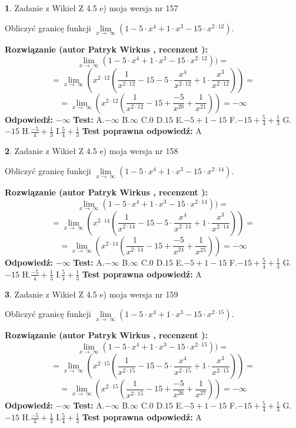 \documentclass[12pt, a4paper]{article}
\theoremstyle{definition} %
\newtheorem{zad}{}
\newcommand{\zadStart}[1]{\begin{zad}#1\newline}
\newcommand{\zadStop}{\end{zad}}
\newcommand{\rozwStart}[2]{\noindent \textbf{Rozwiązanie (autor #1 , recenzent #2): }\newline}
\newcommand{\rozwStop}{\newline}
\newcommand{\odpStart}{\noindent \textbf{Odpowiedź:}\newline}
\newcommand{\odpStop}{\newline}
\newcommand{\testStart}{\noindent \textbf{Test:}\newline}
\newcommand{\testStop}{\newline}
\newcommand{\kluczStart}{\noindent \textbf{Test poprawna odpowiedź:}\newline}
\newcommand{\kluczStop}{\newline}
\begin{document}
\zadStart{Zadanie z Wikieł Z 4.5 e) moja wersja nr 157}



Obliczyć granicę funkcji  $\lim\limits_{x\to\ \infty}(1 - 5 \cdot x^{4}+1 \cdot x^{3}- 15 \cdot x^{2\cdot12})$.
\zadStop
\rozwStart{Patryk Wirkus}{}
$$\lim\limits_{x\to\ \infty}(1 - 5 \cdot x^{4}+1 \cdot x^{3}- 15 \cdot x^{2\cdot12}))=$$
$$=\lim\limits_{x\to\ \infty}(x^{2\cdot12}(\frac{1}{x^{2\cdot12}}-15 -5 \cdot \frac{x^{4}}{x^{2\cdot12}}+1 \cdot \frac{x^{3}}{x^{2\cdot12}}))=$$
$$=\lim\limits_{x\to\ \infty}(x^{2\cdot12}(\frac{1}{x^{2\cdot12}}-15 + \frac{-5}{x^{20}}+ \frac{1}{x^{21}}))=-\infty$$
\rozwStop
\odpStart
$-\infty$
\odpStop
\testStart
A.$-\infty$ B.$\infty$ C.$0$ D.$15$ E.$-5 + 1 - 15$
F.$-15+\frac{5}{4}+\frac{1}{3}$ G.$-15$
H.$\frac{-5}{4}+\frac{1}{3}$
I.$\frac{5}{4}+\frac{1}{3}$
\testStop
\kluczStart
A
\kluczStop



\zadStart{Zadanie z Wikieł Z 4.5 e) moja wersja nr 158}



Obliczyć granicę funkcji  $\lim\limits_{x\to\ \infty}(1 - 5 \cdot x^{4}+1 \cdot x^{3}- 15 \cdot x^{2\cdot14})$.
\zadStop
\rozwStart{Patryk Wirkus}{}
$$\lim\limits_{x\to\ \infty}(1 - 5 \cdot x^{4}+1 \cdot x^{3}- 15 \cdot x^{2\cdot14}))=$$
$$=\lim\limits_{x\to\ \infty}(x^{2\cdot14}(\frac{1}{x^{2\cdot14}}-15 -5 \cdot \frac{x^{4}}{x^{2\cdot14}}+1 \cdot \frac{x^{3}}{x^{2\cdot14}}))=$$
$$=\lim\limits_{x\to\ \infty}(x^{2\cdot14}(\frac{1}{x^{2\cdot14}}-15 + \frac{-5}{x^{24}}+ \frac{1}{x^{25}}))=-\infty$$
\rozwStop
\odpStart
$-\infty$
\odpStop
\testStart
A.$-\infty$ B.$\infty$ C.$0$ D.$15$ E.$-5 + 1 - 15$
F.$-15+\frac{5}{4}+\frac{1}{3}$ G.$-15$
H.$\frac{-5}{4}+\frac{1}{3}$
I.$\frac{5}{4}+\frac{1}{3}$
\testStop
\kluczStart
A
\kluczStop



\zadStart{Zadanie z Wikieł Z 4.5 e) moja wersja nr 159}



Obliczyć granicę funkcji  $\lim\limits_{x\to\ \infty}(1 - 5 \cdot x^{4}+1 \cdot x^{3}- 15 \cdot x^{2\cdot15})$.
\zadStop
\rozwStart{Patryk Wirkus}{}
$$\lim\limits_{x\to\ \infty}(1 - 5 \cdot x^{4}+1 \cdot x^{3}- 15 \cdot x^{2\cdot15}))=$$
$$=\lim\limits_{x\to\ \infty}(x^{2\cdot15}(\frac{1}{x^{2\cdot15}}-15 -5 \cdot \frac{x^{4}}{x^{2\cdot15}}+1 \cdot \frac{x^{3}}{x^{2\cdot15}}))=$$
$$=\lim\limits_{x\to\ \infty}(x^{2\cdot15}(\frac{1}{x^{2\cdot15}}-15 + \frac{-5}{x^{26}}+ \frac{1}{x^{27}}))=-\infty$$
\rozwStop
\odpStart
$-\infty$
\odpStop
\testStart
A.$-\infty$ B.$\infty$ C.$0$ D.$15$ E.$-5 + 1 - 15$
F.$-15+\frac{5}{4}+\frac{1}{3}$ G.$-15$
H.$\frac{-5}{4}+\frac{1}{3}$
I.$\frac{5}{4}+\frac{1}{3}$
\testStop
\kluczStart
A
\kluczStop
\end{document}
